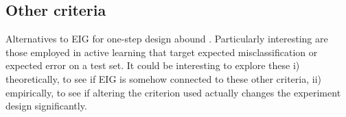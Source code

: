 \subsection{Other criteria}
Alternatives to EIG for one-step design abound \cite{chaloner1995}. Particularly interesting are those employed in active learning that target expected misclassification or expected error on a test set. It could be interesting to explore these i) theoretically, to see if EIG is somehow connected to these other criteria, ii) empirically, to see if altering the criterion used actually changes the experiment design significantly.

